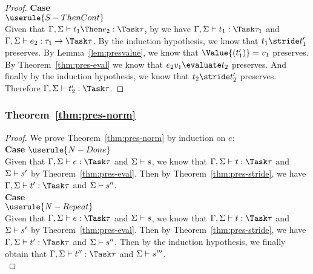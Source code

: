 \begin{proof}
  \noindent\textbf{Case}\\
  $\userule{S-ThenCont}$\\
    \indent  Given that
  $\Gamma,\Sigma\infers t_1\Then e_2:\Task\tau$, by  we have
  $\Gamma,\Sigma\infers t_1:\Task\tau_1$ and
  $\Gamma,\Sigma\infers e_2:\tau_1\to\Task\tau$. By the induction hypothesis, we
  know that $t_1\stride t_1'$ preserves. By Lemma~\ref{lem:presvalue}, we know
  that $\Value{(t_1')}=v_1$ preserves. By Theorem~\ref{thm:pres-eval} we know
  that $e_2 v_1\evaluate t_2$ preserves. And finally by the induction hypothesis,
  we know that $t_2\stride t_2'$ preserves. Therefore
  $\Gamma,\Sigma\infers t_2':\Task\tau$.

\end{proof}

\subsubsection{Theorem~\ref{thm:pres-norm}}

\begin{proof}
  We prove Theorem~\ref{thm:pres-norm} by induction on $e$:\\

  \noindent\textbf{Case} $\userule{N-Done}$ \\
  \indent Given that
  $\Gamma,\Sigma\infers e:\Task\tau$ and $\Sigma\vdash s$, we know that
  $\Gamma,\Sigma\infers t:\Task\tau$ and $\Sigma\vdash s'$ by
  Theorem~\ref{thm:pres-eval}. Then by Theorem~\ref{thm:pres-stride}, we have
  $\Gamma,\Sigma\infers t':\Task\tau$ and $\Sigma\vdash s''$.\\

  \noindent\textbf{Case}\\
  $\userule{N-Repeat}$ \\
  \indent Given that
  $\Gamma,\Sigma\infers e:\Task\tau$ and $\Sigma\vdash s$, we know that
  $\Gamma,\Sigma\infers t:\Task\tau$ and $\Sigma\vdash s'$ by
  Theorem~\ref{thm:pres-eval}. Then by Theorem~\ref{thm:pres-stride}, we have
  $\Gamma,\Sigma\infers t':\Task\tau$ and $\Sigma\vdash s''$. Then by the
  induction hypothesis, we finally obtain that
  $\Gamma,\Sigma\infers t'':\Task\tau$ and $\Sigma\vdash s'''$.\\

\end{proof}


